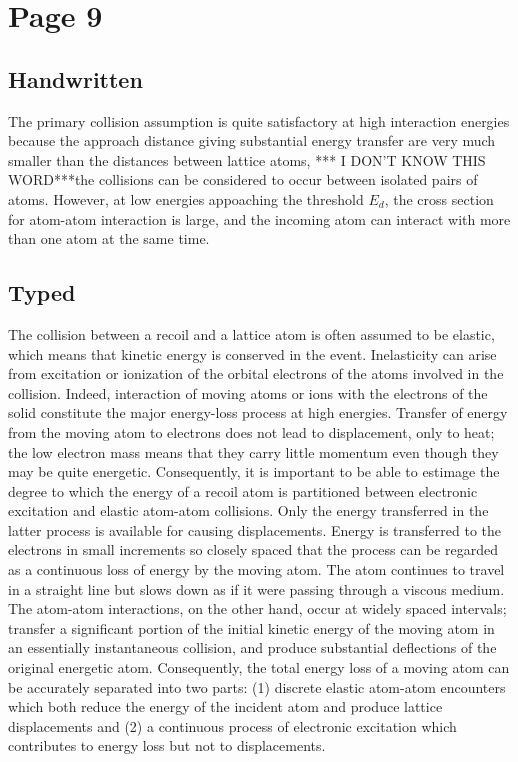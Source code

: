 \documentclass[11pt]{report} %
\newcommand{\IDK}{*** I DON'T KNOW THIS WORD***}
\begin{document}
\section{Page 9}
\subsection{Handwritten}
The primary collision assumption is quite satisfactory at high interaction energies because the approach distance giving substantial energy transfer are very much smaller than the distances between lattice atoms, \IDK the collisions can be considered to occur between isolated pairs of atoms. However, at low energies appoaching the threshold $E_d$, the cross section for atom-atom interaction is large, and the incoming atom can interact with more than one atom at the same time.

\subsection{Typed}
The collision between a recoil and a lattice atom is often assumed to be elastic, which means that kinetic energy is conserved in the event. Inelasticity can arise from excitation or ionization of the orbital electrons of the atoms involved in the collision. Indeed, interaction of moving atoms or ions with the electrons of the solid constitute the major energy-loss process at high energies. Transfer of energy from the moving atom to electrons does not lead to displacement, only to heat; the low electron mass means that they carry little momentum even though they may be quite energetic. Consequently, it is important to be able to estimage the degree to which the energy of a recoil atom is partitioned between electronic excitation and elastic atom-atom collisions. Only the energy transferred in the latter process is available for causing displacements. Energy is transferred to the electrons in small increments so closely spaced that the process can be regarded as a continuous loss of energy by the moving atom. The atom continues to travel in a straight line but slows down as if it were passing through a viscous medium. The atom-atom interactions, on the other hand, occur at widely spaced intervals; transfer a significant portion of the initial kinetic energy of the moving atom in an essentially instantaneous collision, and produce substantial deflections of the original energetic atom. Consequently, the total energy loss of a moving atom can be accurately separated into two parts: (1) discrete elastic atom-atom encounters which both reduce the energy of the incident atom and produce lattice displacements and (2) a continuous process of electronic excitation which contributes to energy loss but not to displacements.
\end{document}
